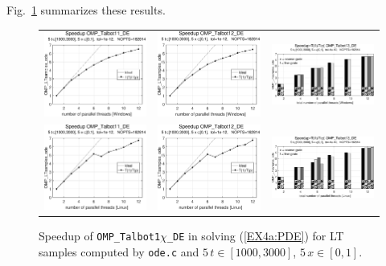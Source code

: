 \documentclass[a4paper,10pt]{report}%
\begin{document}
Fig.~\ref{PAR_EX4a_speedup_ode3} summarizes these results.
\begin{figure}[htb]
\centering
\begin{tabular}{ccc} %
\includegraphics[height=0.2\textwidth]{./FIGS/EX4a/EX4a_ode_speedup_11_5t_1000_Windows.eps} &
\includegraphics[height=0.2\textwidth]{./FIGS/EX4a/EX4a_ode_speedup_12_5t_1000_Windows.eps} &
\includegraphics[height=0.2\textwidth,keepaspectratio=true]{./FIGS/EX4a/EX4a_ode_speedup_13_5t_1000_Windows.eps} \\
\includegraphics[height=0.2\textwidth]{./FIGS/EX4a/EX4a_ode_speedup_11_5t_1000_Linux.eps} &
\includegraphics[height=0.2\textwidth]{./FIGS/EX4a/EX4a_ode_speedup_12_5t_1000_Linux.eps} &
\includegraphics[height=0.2\textwidth,keepaspectratio=true]{./FIGS/EX4a/EX4a_ode_speedup_13_5t_1000_Linux.eps}
\end{tabular}
\caption{\small Speedup of {\tt OMP\_Talbot1$\chi$\_DE} in solving (\ref{EX4a:PDE}) for LT samples
computed by {\tt ode.c} and $5\,t\in[1000,3000]$, $5\,x\in[0,1]$.}
\label{PAR_EX4a_speedup_ode3}
\end{figure}
\end{document}
